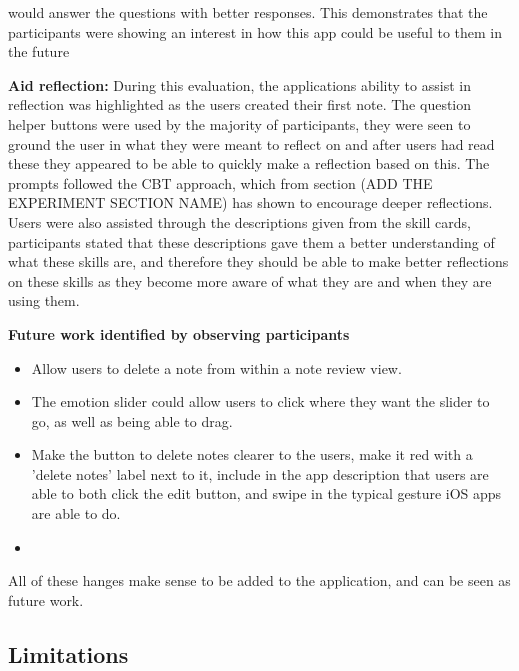 \documentclass{l4proj}
\begin{document}
would answer the questions with better responses. This demonstrates that the participants were showing an interest in how this app
could be useful to them in the future
\par 
\textbf{Aid reflection:} During this evaluation, the applications ability to assist in reflection was highlighted as the users 
created their first note. The question helper buttons were used by the majority of participants, they were seen to ground the user
in what they were meant to reflect on and after users had read these they appeared to be able to quickly make a reflection based on this.
The prompts followed the CBT approach, which from section (ADD THE EXPERIMENT SECTION NAME) has shown to encourage deeper reflections.
Users were also assisted through the descriptions given from the skill cards, participants stated that these descriptions gave them a
better understanding of what these skills are, and therefore they should be able to make better reflections on these skills as they become
more aware of what they are and when they are using them.
\par 
\textbf{Future work identified by observing participants}
\begin{itemize}
    \item Allow users to delete a note from within a note review view.
    \item The emotion slider could allow users to click where they want the slider to go, as well as being able to drag.
    \item Make the button to delete notes clearer to the users, make it red with a 'delete notes' label next to it, include 
    in the app description that users are able to both click the edit button, and swipe in the typical gesture iOS apps are able to do.
    \item 
\end{itemize}
All of these hanges make sense to be added to the application, and can be seen as future work.


\subsection{Limitations}
\end{document}
